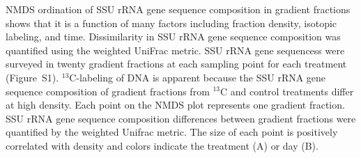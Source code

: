 NMDS ordination of SSU rRNA gene sequence composition in
gradient fractions shows that it is
a function of many factors including fraction density, isotopic labeling, and
time. Dissimilarity in SSU rRNA gene sequence composition was quantified using the 
weighted UniFrac metric. SSU rRNA gene sequencess were surveyed in twenty
gradient fractions at each sampling point for each treatment (Figure~S1).
$^{13}$C-labeling of DNA is apparent because the SSU rRNA gene sequence composition of
gradient fractions from $^{13}$C and control treatments differ at high density.
Each point on the NMDS plot represents one gradient fraction.  SSU rRNA gene sequence
composition differences between gradient fractions were quantified by the
weighted Unifrac metric. The size of each point is positively correlated with
density and colors indicate the treatment (A) or day (B).
